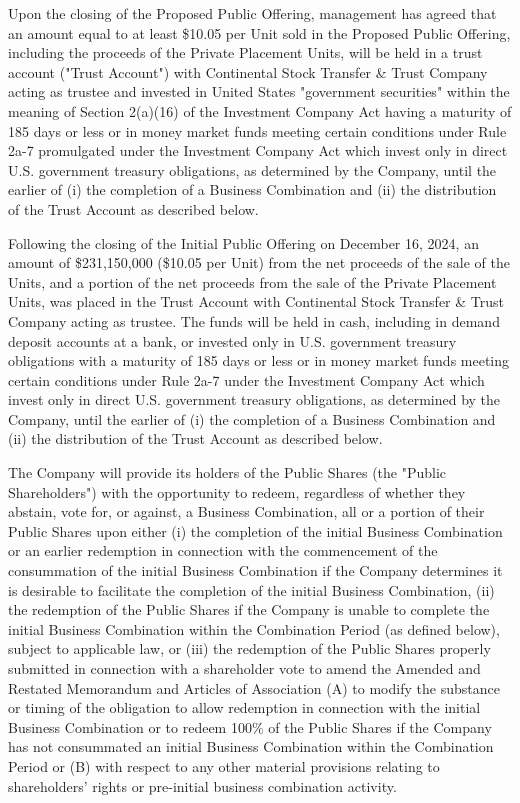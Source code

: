 \documentclass[11pt,a4paper]{article}
\begin{document}
Upon the closing of the Proposed Public Offering, management has agreed that an amount equal to at least \$10.05 per Unit sold in the Proposed Public Offering, including the proceeds of the Private Placement Units, will be held in a trust account ("Trust Account") with Continental Stock Transfer \& Trust Company acting as trustee and invested in United States "government securities" within the meaning of Section 2(a)(16) of the Investment Company Act having a maturity of 185 days or less or in money market funds meeting certain conditions under Rule 2a-7 promulgated under the Investment Company Act which invest only in direct U.S. government treasury obligations, as determined by the Company, until the earlier of (i) the completion of a Business Combination and (ii) the distribution of the Trust Account as described below.

Following the closing of the Initial Public Offering on December 16, 2024, an amount of \$231,150,000 (\$10.05 per Unit) from the net proceeds of the sale of the Units, and a portion of the net proceeds from the sale of the Private Placement Units, was placed in the Trust Account with Continental Stock Transfer \& Trust Company acting as trustee. The funds will be held in cash, including in demand deposit accounts at a bank, or invested only in U.S. government treasury obligations with a maturity of 185 days or less or in money market funds meeting certain conditions under Rule 2a-7 under the Investment Company Act which invest only in direct U.S. government treasury obligations, as determined by the Company, until the earlier of (i) the completion of a Business Combination and (ii) the distribution of the Trust Account as described below.

The Company will provide its holders of the Public Shares (the "Public Shareholders") with the opportunity to redeem, regardless of whether they abstain, vote for, or against, a Business Combination, all or a portion of their Public Shares upon either (i) the completion of the initial Business Combination or an earlier redemption in connection with the commencement of the consummation of the initial Business Combination if the Company determines it is desirable to facilitate the completion of the initial Business Combination, (ii) the redemption of the Public Shares if the Company is unable to complete the initial Business Combination within the Combination Period (as defined below), subject to applicable law, or (iii) the redemption of the Public Shares properly submitted in connection with a shareholder vote to amend the Amended and Restated Memorandum and Articles of Association (A) to modify the substance or timing of the obligation to allow redemption in connection with the initial Business Combination or to redeem 100\% of the Public Shares if the Company has not consummated an initial Business Combination within the Combination Period or (B) with respect to any other material provisions relating to shareholders' rights or pre-initial business combination activity.
\end{document}
